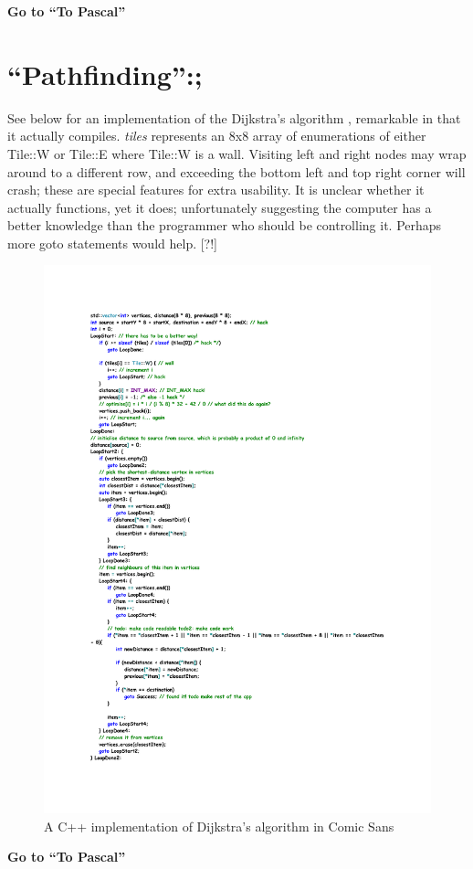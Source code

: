 \documentclass{journal}
\begin{document}
\textbf{Go to ``To Pascal''}

\newpage

\setcounter{section}{0}
\section{``Pathfinding'':;}
See below for an implementation of the Dijkstra's algorithm \cite{pathfinding}, remarkable in that it actually compiles. \textit{tiles} represents an 8x8 array of enumerations of either Tile::W or Tile::E where Tile::W is a wall. Visiting left and right nodes may wrap around to a different row, and exceeding the bottom left and top right corner will crash; these are special features for extra usability. It is unclear whether it actually functions, yet it does; unfortunately suggesting the computer has a better knowledge than the programmer who should be controlling it. Perhaps more goto statements would help. [?!]

\begin{figure}[h]
\includegraphics[width=0.8\linewidth]{Pathfinding.pdf}
\caption{A C++ implementation of Dijkstra's algorithm \cite{pathfinding} in Comic Sans}
\end{figure}

\textbf{Go to ``To Pascal''}



\end{document}
